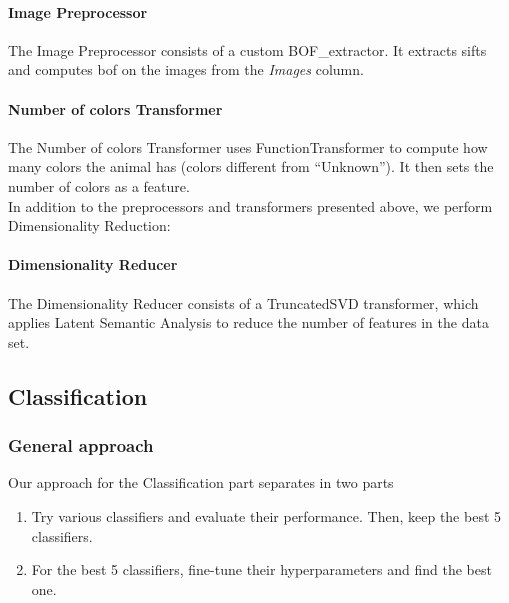 \documentclass[12pt]{article}
\begin{document}
\paragraph{Image Preprocessor} The Image Preprocessor consists of a custom  BOF\_extractor. It extracts \glspl{sift} and computes \gls{bof} on the images from the \textit{Images} column.

\paragraph{Number of colors Transformer} The Number of colors Transformer uses FunctionTransformer to compute how many colors the animal has (\ie colors different from ``Unknown''). It then sets the number of colors as a feature. \\
In addition to the preprocessors and transformers presented above, we perform Dimensionality Reduction:

\paragraph{Dimensionality Reducer} The Dimensionality Reducer consists of a TruncatedSVD transformer, which applies Latent Semantic Analysis to reduce the number of features in the data set.

\subsection{Classification}

\subsubsection{General approach}
Our approach for the Classification part separates in two parts
\begin{enumerate}
    \item Try various classifiers and evaluate their performance. Then, keep the best 5 classifiers.
    \item For the best 5 classifiers, fine-tune their hyperparameters and find the best one.
\end{enumerate}
\end{document}
